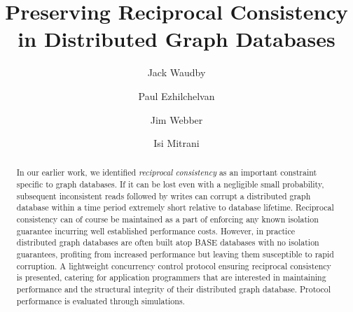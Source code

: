 \documentclass[sigplan,10pt]{acmart}
\begin{document}
\title{Preserving Reciprocal Consistency in Distributed Graph Databases}

\author{Jack Waudby}

\author{Paul Ezhilchelvan}

\author{Jim Webber}

\author{Isi Mitrani}

\renewcommand{\shortauthors}{Waudby, et al.}

\begin{abstract}

In our earlier work, we identified \emph{reciprocal consistency} as an important constraint specific to graph databases. If it can be lost even with a negligible small probability, subsequent inconsistent reads followed by writes can corrupt a distributed graph database within a time period extremely short relative to database lifetime. Reciprocal consistency can of course be maintained as a part of enforcing any known isolation guarantee incurring well established performance costs. However, in practice distributed graph databases are often built atop BASE databases with no isolation guarantees, profiting from increased performance but leaving them susceptible to rapid corruption. A lightweight concurrency control protocol ensuring reciprocal consistency is presented, catering for application programmers that are interested in maintaining performance and the structural integrity of their distributed graph database. Protocol performance is evaluated through simulations.
\end{abstract}

\end{document}
